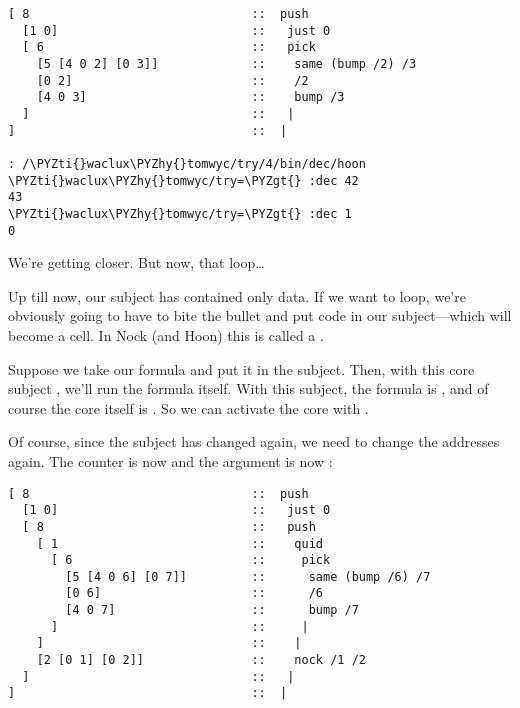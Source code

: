 \begin{framed_shaded}
\begin{Verbatim}[fontsize=\relsize{-2.5},fontseries=b,commandchars=\\\{\}]
[ 8                               ::  push
  [1 0]                           ::   just 0
  [ 6                             ::   pick
    [5 [4 0 2] [0 3]]             ::    same (bump /2) /3
    [0 2]                         ::    /2
    [4 0 3]                       ::    bump /3
  ]                               ::   |
]                                 ::  |

: /\PYZti{}waclux\PYZhy{}tomwyc/try/4/bin/dec/hoon
\PYZti{}waclux\PYZhy{}tomwyc/try=\PYZgt{} :dec 42
43
\PYZti{}waclux\PYZhy{}tomwyc/try=\PYZgt{} :dec 1
0
\end{Verbatim}
\end{framed_shaded}

We're getting closer.  But now, that loop\ldots{}

Up till now, our subject has contained only data.  If we want to
loop, we're obviously going to have to bite the bullet and put
code in our subject---which will become a  cell.
In Nock (and Hoon) this is called a .

Suppose we take our  formula and put it in the subject.  Then,
with this core subject , we'll run
the formula itself.  With this subject, the formula is , and
of course the core itself is .  So we can activate the core
with \kode{[2 [0 1] [0 2]]}.

Of course, since the subject has changed again, we need to change
the addresses again.  The counter is now  and the argument
is now :

\begin{framed_shaded}
\begin{Verbatim}[fontsize=\relsize{-2.5},fontseries=b,commandchars=\\\{\}]
[ 8                               ::  push
  [1 0]                           ::   just 0
  [ 8                             ::   push
    [ 1                           ::    quid
      [ 6                         ::     pick
        [5 [4 0 6] [0 7]]         ::      same (bump /6) /7
        [0 6]                     ::      /6
        [4 0 7]                   ::      bump /7
      ]                           ::     |
    ]                             ::    |
    [2 [0 1] [0 2]]               ::    nock /1 /2
  ]                               ::   |
]                                 ::  |
\end{Verbatim}
\end{framed_shaded}

